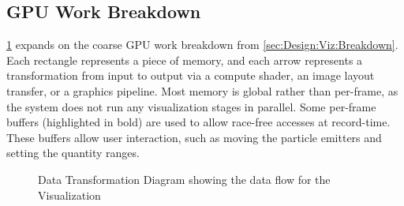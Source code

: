 \subsection{GPU Work Breakdown}
\cref{fig:VizDataTransform} expands on the coarse GPU work breakdown from \cref{sec:Design:Viz:Breakdown}.
Each rectangle represents a piece of memory, and each arrow represents a transformation from input to output via a compute shader, an image layout transfer, or a graphics pipeline.
Most memory is global rather than per-frame, as the system does not run any visualization stages in parallel.
Some per-frame buffers (highlighted in bold) are used to allow race-free accesses at record-time.
These buffers allow user interaction, such as moving the particle emitters and setting the quantity ranges.
\pagebreak
{}
\begin{figure}
    \centering
    \caption{Data Transformation Diagram showing the data flow for the Visualization}
    \label{fig:VizDataTransform}
\end{figure}
\restoregeometry
\pagebreak

